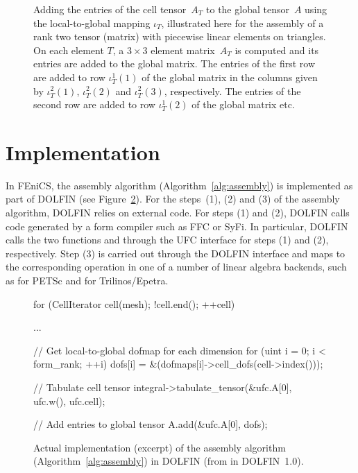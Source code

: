\begin{figure}
\centering
  \caption{Adding the entries of the cell tensor~$A_T$ to the global
    tensor~$A$ using the local-to-global mapping $\iota_T$,
    illustrated here for the assembly of a rank two tensor (matrix)
    with piecewise linear elements on triangles. On each element
    $T$, a $3 \times 3$ element matrix~$A_T$ is computed and its
    entries are added to the global matrix. The entries of the first
    row are added to row $\iota^1_T(1)$ of the global matrix in the
    columns given by $\iota^2_T(1)$, $\iota^2_T(2)$ and
    $\iota^2_T(3)$, respectively. The entries of the second row are
    added to row $\iota^1_T(2)$ of the global matrix etc.}
  \label{fig:insertion}
\end{figure}

\section{Implementation}

In FEniCS, the assembly algorithm (Algorithm~\ref{alg:assembly}) is
implemented as part of DOLFIN (see
Figure~\ref{fig:assembly,code}). For the steps~(1), (2) and (3) of the
assembly algorithm, DOLFIN relies on external code. For steps (1) and
(2), DOLFIN calls code generated by a form compiler such as FFC or
SyFi. In particular, DOLFIN calls the two functions
 and  through the UFC
interface for steps (1) and (2), respectively. Step (3) is carried out
through the DOLFIN  interface and maps to the
corresponding operation in one of a number of linear algebra backends,
such as  for PETSc and 
for Trilinos/Epetra.\enlargethispage{5pt}

\begin{figure}
\bwfig
  \begin{c++}
for (CellIterator cell(mesh); !cell.end(); ++cell)
{
  ...

  // Get local-to-global dofmap for each dimension
  for (uint i = 0; i < form_rank; ++i)
    dofs[i] = &(dofmaps[i]->cell_dofs(cell->index()));

  // Tabulate cell tensor
  integral->tabulate_tensor(&ufc.A[0],
                            ufc.w(),
                            ufc.cell);

  // Add entries to global tensor
  A.add(&ufc.A[0], dofs);
}
\end{c++}
  \caption{Actual implementation (excerpt) of the assembly algorithm
    (Algorithm~\ref{alg:assembly}) in DOLFIN (from 
    in DOLFIN~1.0).}
  \label{fig:assembly,code}
\end{figure}

